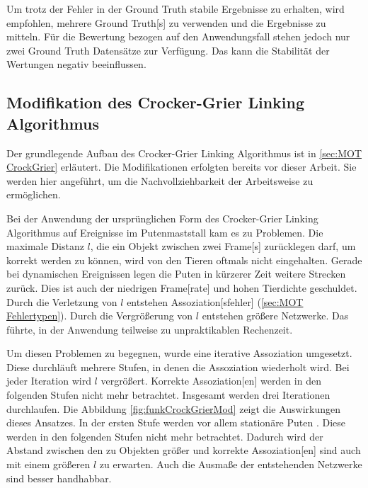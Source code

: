 Um trotz der Fehler in der Ground Truth stabile Ergebnisse zu erhalten, wird empfohlen, mehrere \gls{Ground Truth}[s] zu verwenden und die Ergebnisse zu mitteln. Für die Bewertung bezogen auf den Anwendungsfall stehen jedoch nur zwei \gls{Ground Truth} Datensätze zur Verfügung. Das kann die Stabilität der Wertungen negativ beeinflussen.


\subsection{Modifikation des Crocker-Grier Linking Algorithmus} \label{sec:Meth CrockGrieMods}
Der grundlegende Aufbau des Crocker-Grier Linking Algorithmus ist in \autoref{sec:MOT CrockGrier} erläutert. Die Modifikationen erfolgten bereits vor dieser Arbeit. Sie werden hier angeführt, um die Nachvollziehbarkeit der Arbeitsweise zu ermöglichen. \par

Bei der Anwendung der ursprünglichen Form des Crocker-Grier Linking Algorithmus auf Ereignisse im Putenmaststall kam es zu Problemen. Die maximale Distanz \(l\), die ein Objekt zwischen zwei \gls{Frame}[s] zurücklegen darf, um korrekt  werden zu können, wird von den Tieren oftmals nicht eingehalten. Gerade bei dynamischen Ereignissen legen die Puten in kürzerer Zeit weitere Strecken zurück. Dies ist auch der niedrigen \gls{Frame}[rate] und hohen Tierdichte geschuldet. Durch die Verletzung von \(l\) entstehen \gls{Assoziation}[sfehler] (\autoref{sec:MOT Fehlertypen}). Durch die Vergrößerung von \(l\) entstehen größere Netzwerke. Das führte, in der Anwendung teilweise zu unpraktikablen Rechenzeit.\par

Um diesen Problemen zu begegnen, wurde eine iterative \gls{Assoziation} umgesetzt. Diese durchläuft mehrere Stufen, in denen die \gls{Assoziation} wiederholt wird. Bei jeder Iteration wird \(l\) vergrößert. Korrekte \gls{Assoziation}[en] werden in den folgenden Stufen nicht mehr betrachtet. Insgesamt werden drei Iterationen durchlaufen. Die Abbildung \ref{fig:funkCrockGrierMod} zeigt die Auswirkungen dieses Ansatzes. In der ersten Stufe werden vor allem stationäre Puten . Diese werden in den folgenden Stufen nicht mehr betrachtet. Dadurch wird der Abstand zwischen den zu  Objekten größer und korrekte \gls{Assoziation}[en] sind auch mit einem größeren \(l\) zu erwarten. Auch die Ausmaße der entstehenden Netzwerke sind besser handhabbar. 

